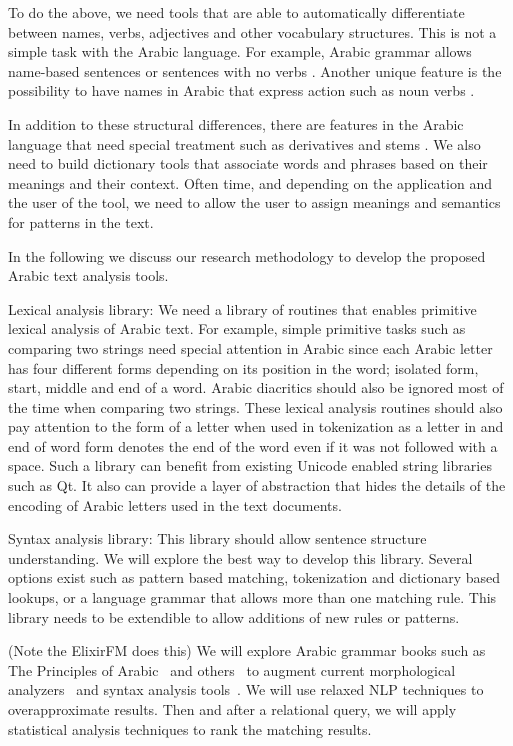 \documentclass[12pt]{article}
\newcommand{\noTrNoVocRL}[1]{\novocalize\transfalse\RL{#1}\transtrue\vocalize}
\begin{document}
To do the above,
 we need tools that are able to automatically differentiate between names,
 verbs,
 adjectives and other vocabulary structures.
 This is not a simple task with the Arabic language.
 For example,
 Arabic grammar allows name-based sentences or sentences with no 
    verbs \noTrNoVocRL{^gml ismiyT} .
 Another unique feature is the possibility to have names in Arabic 
 that express action such as noun verbs 
 \noTrNoVocRL{ism f`l, f-a`l $\ldots$}.

 In addition to these structural differences,
 there are features in the Arabic language that need special 
 treatment such as derivatives and stems 
 \noTrNoVocRL{alm^staq-at w al^g_dwr}.
 We also need to build dictionary tools that associate words and phrases based on their meanings and their context.
 Often time,
 and depending on the application and the user of the tool,
 we need to allow the user to assign meanings and semantics for patterns in the text.

In the following we discuss our research methodology to develop the proposed Arabic text analysis tools.
 
Lexical analysis library: We need a library of routines that enables primitive lexical analysis of Arabic text.
 For example,
 simple primitive tasks such as comparing two strings need special attention in Arabic since each Arabic letter has four different forms depending on its position in the word; isolated form,
 start,
 middle and end of a word.
 Arabic diacritics should also be ignored most of the time when comparing two strings.
 These lexical analysis routines should also pay attention to the form of a letter when used in tokenization as a letter in and end of word form denotes the end of the word even if it was not followed with a space.
 Such a library can benefit from existing Unicode enabled string libraries such as Qt.
 It also can provide a layer of abstraction that hides the details of the encoding of Arabic letters used in the text documents.
 
Syntax analysis library: This library should allow sentence structure understanding.
 We will explore the best way to develop this library.
 Several options exist such as pattern based matching,
 tokenization and dictionary based lookups,
 or a language grammar that allows more than one matching rule.
 This library needs to be extendible to allow additions of new rules or patterns.

 (Note the ElixirFM does this)
 We will explore Arabic grammar books such as The Principles of Arabic~\cite{Sha73} and others~\cite{Abd00,Abd001}
 to augment current morphological analyzers~\cite{Tim04} and syntax analysis tools~\cite{Col09}.
 We will use relaxed NLP techniques to overapproximate results.
 Then and after a relational query,
 we will apply statistical analysis techniques to rank the matching results.
\end{document}
